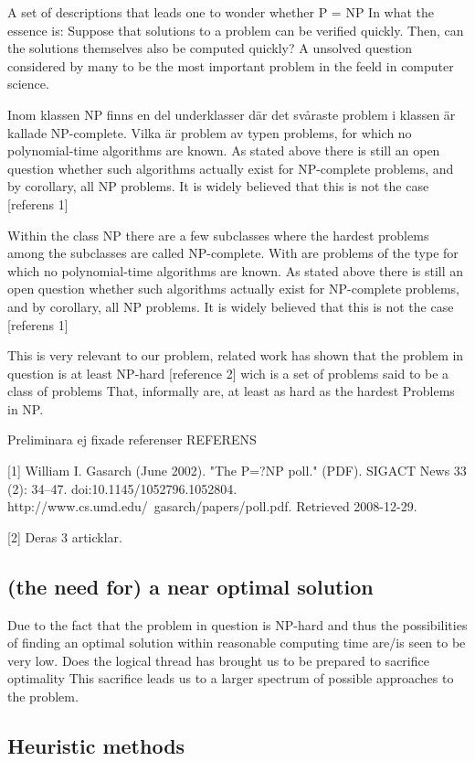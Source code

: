 A set of descriptions that leads one to wonder whether
P = NP
In what the essence is:
Suppose that solutions to a problem can be verified quickly. Then, can the solutions themselves also be computed quickly?
A unsolved question considered by many to be the most important problem in the feeld in computer science.
 
 
Inom klassen NP finns en del underklasser där det svåraste problem i klassen är kallade NP-complete. Vilka är problem av typen problems, for which no polynomial-time algorithms are known. As stated above there is still an open question whether such algorithms actually exist for NP-complete problems, and by corollary, all NP problems. It is widely believed that this is not the case [referens 1]
 
Within the class NP there are a few subclasses  where the hardest problems among the subclasses are called NP-complete. With are problems of the type for which no polynomial-time algorithms are known. As stated above there is still an open question whether such algorithms actually exist for NP-complete problems, and by corollary, all NP problems. It is widely believed that this is not the case [referens 1]
 
This is very relevant to our problem, related work has shown that the problem in question is at least NP-hard [reference 2] wich is a set of problems said to be a class of problems That, informally are, at least as hard as the hardest Problems in NP.
 
 
Preliminara ej fixade referenser
REFERENS
 
[1]
William I. Gasarch (June 2002). "The P=?NP poll." (PDF). SIGACT News 33 (2): 34–47. doi:10.1145/1052796.1052804. http://www.cs.umd.edu/~gasarch/papers/poll.pdf. Retrieved 2008-12-29. 
 
[2]
Deras 3 articklar.
 
\subsection{(the need for) a near optimal solution}
 
Due to the fact that the problem in question is NP-hard and thus the possibilities of finding an optimal solution within reasonable computing time are/is seen to be very low. Does the logical thread has brought us to be prepared to sacrifice optimality
This sacrifice leads us to a larger spectrum of possible approaches to the problem.
 
\subsection{Heuristic methods}
 
